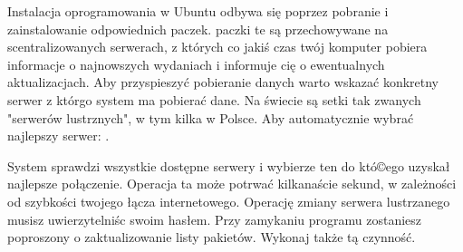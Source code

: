 Instalacja oprogramowania w Ubuntu odbywa się poprzez pobranie i zainstalowanie odpowiednich paczek. paczki te są przechowywane na scentralizowanych serwerach, z których co jakiś czas twój komputer pobiera informacje o najnowszych wydaniach i informuje cię o ewentualnych aktualizacjach. Aby przyspieszyć pobieranie danych warto wskazać konkretny serwer z którgo system ma pobierać dane. Na świecie są setki tak zwanych "serwerów lustrznych", w tym kilka w Polsce. Aby automatycznie wybrać najlepszy serwer: .

System sprawdzi wszystkie dostępne serwery i wybierze ten do któ©ego uzyskał najlepsze połączenie. Operacja ta może potrwać kilkanaście sekund, w zależności od szybkości twojego łącza internetowego. Operację zmiany serwera lustrzanego musisz uwierzytelniśc swoim hasłem. Przy zamykaniu programu zostaniesz poproszony o zaktualizowanie listy pakietów. Wykonaj także tą czynność.